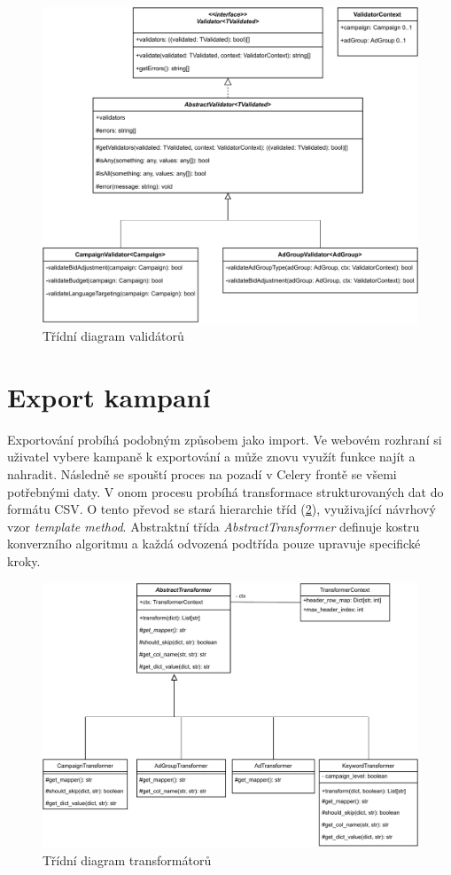 \begin{figure}[h]
    \centering
    \includegraphics[width=1\textwidth]{Figures/Validators.pdf}
    \caption{Třídní diagram validátorů}
    \label{fig:validators}
\end{figure}

\section{Export kampaní}
Exportování probíhá podobným způsobem jako import. Ve webovém rozhraní si uživatel vybere kampaně k exportování a může znovu využít funkce najít a nahradit.
Následně se spouští proces na pozadí v Celery frontě se všemi potřebnými daty. V onom procesu probíhá transformace strukturovaných dat do
formátu CSV. O tento převod se stará hierarchie tříd (\ref{fig:transformers}), využivající návrhový vzor \emph{template method}.
Abstraktní třída \emph{AbstractTransformer} definuje kostru konverzního algoritmu a každá odvozená podtřída pouze upravuje specifické
kroky. 

\begin{figure}[h]
    \centering
    \includegraphics[width=1\textwidth]{Figures/Transformers.pdf}
    \caption{Třídní diagram transformátorů}
    \label{fig:transformers}
\end{figure}

\endinput